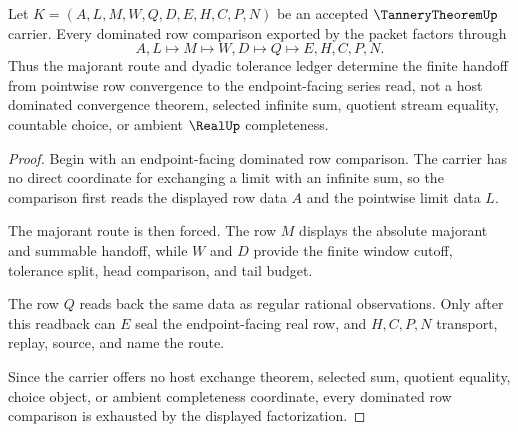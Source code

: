 
\begin{theorem}
\label{thm:tannery-theorem-dominated-row-handoff}
Let $K=(A,L,M,W,Q,D,E,H,C,P,N)$ be an accepted $\TanneryTheoremUp$ carrier. Every dominated row comparison exported by the packet factors through
$$
A,L \longmapsto M \longmapsto W,D \longmapsto Q \longmapsto E,H,C,P,N .
$$
Thus the majorant route and dyadic tolerance ledger determine the finite handoff from pointwise row convergence to the endpoint-facing series read, not a host dominated convergence theorem, selected infinite sum, quotient stream equality, countable choice, or ambient $\RealUp$ completeness.
\end{theorem}
\begin{proof}
Begin with an endpoint-facing dominated row comparison. The carrier has no direct coordinate for exchanging a limit with an infinite sum, so the comparison first reads the displayed row data $A$ and the pointwise limit data $L$.

The majorant route is then forced. The row $M$ displays the absolute majorant and summable handoff, while $W$ and $D$ provide the finite window cutoff, tolerance split, head comparison, and tail budget.

The row $Q$ reads back the same data as regular rational observations. Only after this readback can $E$ seal the endpoint-facing real row, and $H,C,P,N$ transport, replay, source, and name the route.

Since the carrier offers no host exchange theorem, selected sum, quotient equality, choice object, or ambient completeness coordinate, every dominated row comparison is exhausted by the displayed factorization.
\end{proof}

